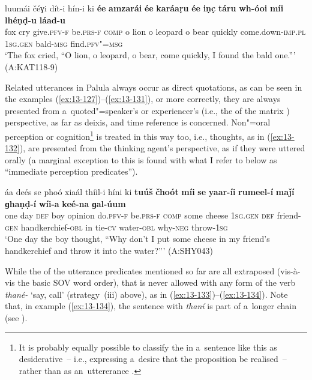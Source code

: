 \ex
\label{ex:13-131}
\gll luumái čéɣi dít-i hín-i ki \textbf{ée} \textbf{amzarái} \textbf{ée} \textbf{karáaṛu} \textbf{ée} \textbf{iṇc̣} \textbf{táru} \textbf{wh-óoi} \textbf{míi} \textbf{lhéṇḍ-u} \textbf{láad-u}\\
fox cry give.\textsc{pfv-f} be.\textsc{prs-f} \textsc{comp} o lion  o leopard o bear quickly come.down-\textsc{imp.pl} \textsc{1sg.gen} bald-\textsc{msg} find.\textsc{pfv"=msg}  \\
\glt `The fox cried, ``O lion, o leopard, o bear, come quickly, I found the bald one.''' (A:KAT118-9) 
\z

\largerpage
Related utterances in Palula always occur as direct quotations, as can be seen in the examples (\ref{ex:13-127})--(\ref{ex:13-131}), or more correctly, they are always presented from a~quoted"=speaker's or experiencer's (i.e., the  of the matrix ) perspective, as far as deixis,  and time reference is concerned. Non"=oral perception or cognition\footnote{It is probably equally possible to classify the  in a~sentence like this as desiderative~-- i.e., expressing a~desire that the proposition be realised~-- rather than as an~uttererance .} is treated in this way too, i.e., thoughts, as in (\ref{ex:13-132}), are presented from the thinking agent's perspective, as if they were uttered orally (a marginal exception to this is found with what I refer to below as ``immediate perception predicates''). 

\ea
\label{ex:13-132}
\gll áa deés se phoó xiaál thíil-i híni ki \textbf{tuúš} \textbf{čhoót} \textbf{míi} \textbf{se} \textbf{yaar-íi} \textbf{rumeel-í} \textbf{maǰí} \textbf{ɡhaṇḍ-í} \textbf{wíi-a} \textbf{keé-na} \textbf{ɡal-úum}\\
one day \textsc{def} boy opinion do.\textsc{pfv-f} be.\textsc{prs-f} \textsc{comp} some cheese \textsc{1sg.gen} \textsc{def} friend-\textsc{gen} handkerchief-\textsc{obl}  in tie-\textsc{cv} water-\textsc{obl} why-\textsc{neg} throw-\textsc{1sg}\\
\glt `One day the boy thought, ``Why don't I put some cheese in my friend's handkerchief and throw it into the water?''' (A:SHY043)
\z

While the  of the utterance predicates mentioned so far are all extraposed (vis-à-vis the basic SOV word order), that is never allowed with any form of the verb \textit{thané-} `say, call' (strategy~(iii) above), as in (\ref{ex:13-133})--(\ref{ex:13-134}). Note that, in example (\ref{ex:13-134}), the sentence with \textit{thaní} is part of a~longer  chain (see ).

